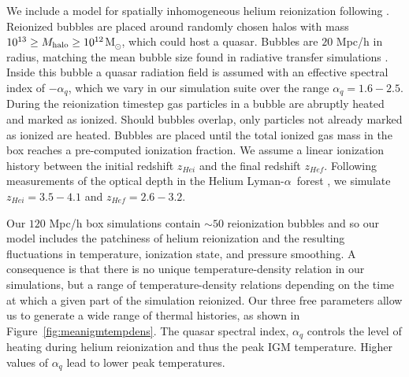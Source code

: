 \documentclass[a4paper,11pt]{article}
\newcommand{\Lya}{Lyman-$\alpha$}
\begin{document}
We include a model for spatially inhomogeneous helium reionization following \cite{UptonSanderbeck:2020}. Reionized bubbles are placed around randomly chosen halos with mass $10^{13} \geq M_{\rm halo}\geq 10^{12}$M$_{\odot}$, which could host a quasar. Bubbles are $20$ Mpc/h in radius, matching the mean bubble size found in radiative transfer simulations \citep{McQuinn:2009}. Inside this bubble a quasar radiation field is assumed with an effective spectral index of $- \alpha_q$, which we vary in our simulation suite over the range $\alpha_q  = 1.6 - 2.5$. During the reionization timestep gas particles in a bubble are abruptly heated and marked as ionized. Should bubbles overlap, only particles not already marked as ionized are heated. Bubbles are placed until the total ionized gas mass in the box reaches
a pre-computed ionization fraction. We assume a linear ionization history between the initial redshift $z_{Hei}$ and the final redshift $z_{Hef}$. Following measurements of the optical depth in the Helium \Lya~forest \cite{Worseck:2019}, we simulate $z_{Hei} = 3.5 -  4.1$ and $z_{Hef} = 2.6 - 3.2$.

Our $120$ Mpc/h box simulations contain $\sim 50$ reionization bubbles and so our model includes the patchiness of helium reionization and the resulting fluctuations in temperature, ionization state, and pressure smoothing. A consequence is that there is no unique temperature-density relation in our simulations, but a range of temperature-density relations depending on the time at which a given part of the simulation reionized. Our three free parameters allow us to generate a wide range of thermal histories, as shown in Figure~\ref{fig:meanigmtempdens}. The quasar spectral index, $\alpha_q$ controls the level of heating during helium reionization and thus the peak IGM temperature. Higher values of $\alpha_q$ lead to lower peak temperatures.

\end{document}
